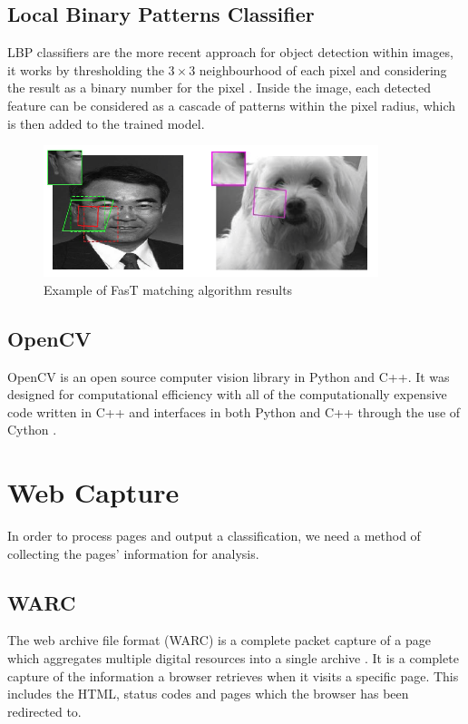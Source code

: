 \documentclass[12pt,twoside]{report}
\begin{document}
\subsection{Local Binary Patterns Classifier}
LBP classifiers are the more recent approach for object detection within images, it works by thresholding the $3 \times 3$ neighbourhood of each pixel and considering the result as a binary number for the pixel \cite{lbpclassification}. Inside the image, each detected feature can be considered as a cascade of patterns within the pixel radius, which is then added to the trained model.
\begin{figure}[h]
  \begin{center}
    \includegraphics[]{images/fastmatching.png}
  \end{center}
  \caption{Example of FasT matching algorithm results~\cite{fastmatching}}
  \label{fig:fastmatching}
\end{figure}
\subsection{OpenCV}
OpenCV is an open source computer vision library in Python and C++. It was designed for computational efficiency with all of the computationally expensive code written in C++ and interfaces in both Python and C++ through the use of Cython \cite{cython}\cite{opencv}. 
\section{Web Capture}
In order to process pages and output a classification, we need a method of collecting the pages' information for analysis.
\subsection{WARC}
The web archive file format (WARC) is a complete packet capture of a page which aggregates multiple digital resources into a single archive \cite{warc}. It is a complete capture of the information a browser retrieves when it visits a specific page. This includes the HTML, status codes and pages which the browser has been redirected to.
\end{document}
